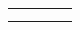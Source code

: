\documentclass[10pt,]{article}
\theoremstyle{plain}
\theoremstyle{definition}
\theoremstyle{definition}
\theoremstyle{definition}
\theoremstyle{definition}
\theoremstyle{definition}
\theoremstyle{definition}
\numberwithin{equation}{section}
\newlength{\panelmax}
\begin{document}
{\begin{tabular}{@{}*{4}{c}@{}}
\begin{minipage}[c][\panelmax][t]{0.2\linewidth}\usebox{\panelboxAimage}\end{minipage}&
\begin{minipage}[c][\panelmax][t]{0.2\linewidth}\usebox{\panelboxBimage}\end{minipage}&
\begin{minipage}[c][\panelmax][t]{0.2\linewidth}\usebox{\panelboxCimage}\end{minipage}&
\begin{minipage}[c][\panelmax][t]{0.2\linewidth}\usebox{\panelboxDimage}\end{minipage}\tabularnewline
\parbox[t]{0.2\linewidth}{
}&
\parbox[t]{0.2\linewidth}{
}&
\parbox[t]{0.2\linewidth}{
}&
\parbox[t]{0.2\linewidth}{
}\end{tabular}\\
}%
\end{document}
